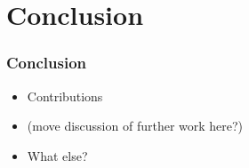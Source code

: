 \documentclass{beamer}
\begin{document}
\section{Conclusion}

\begin{frame}
\frametitle{Conclusion}

\begin{itemize}
	\item Contributions
	\item (move discussion of further work here?)
	\item What else?
\end{itemize}
\end{frame}



%
\end{document}
